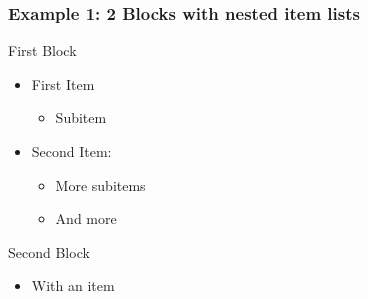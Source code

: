 \documentclass[mathserif]{beamer}
\begin{document}
\begin{frame}
\frametitle{Example 1: 2 Blocks with nested item lists}
\begin{block}{First Block}
\begin{itemize}
\item First Item
	\begin{itemize}
	\item Subitem
	\end{itemize}
\item Second Item:
	\begin{itemize}
	\item More subitems
	\item And more
	\end{itemize}
\end{itemize}
\end{block}
\begin{block}{Second Block}
\begin{itemize}
\item With an item
\end{itemize}
\end{block}
\end{frame}
\end{document}
